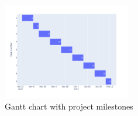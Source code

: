 \documentclass[twocolumn]{article}
\begin{document}
\begin{figure}
    \centering
    \includegraphics[width=0.5\textwidth]{gantt_chart.pdf}
    \caption{Gantt chart with project milestones}
    \label{gantt_chart}
\end{figure}
\end{document}
